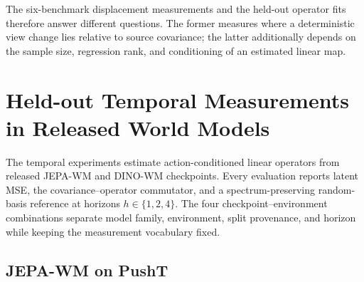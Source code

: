 \documentclass{article}
\begin{document}
\begin{table}[H]
\centering
\small
\setlength{\tabcolsep}{3pt}
\caption{Held-out I-JEPA operator-rank sweep. A low-rank ridge map is fit from source to horizontal-flip features in source-PCA coordinates. The table reports held-out prediction and covariance-relative operator measurements across ranks.}
\label{tab:supp-ijepa-operator}
\end{table}

The six-benchmark displacement measurements and the held-out operator fits
therefore answer different questions. The former measures where a deterministic
view change lies relative to source covariance; the latter additionally
depends on the sample size, regression rank, and conditioning of an estimated
linear map.

\section{Held-out Temporal Measurements in Released World Models}
\label{sec:supp-temporal}

The temporal experiments estimate action-conditioned linear operators from
released JEPA-WM and DINO-WM checkpoints. Every evaluation reports latent MSE,
the covariance--operator commutator, and a spectrum-preserving random-basis
reference at horizons $h\in\{1,2,4\}$. The four checkpoint--environment
combinations separate model family, environment, split provenance, and
horizon while keeping the measurement vocabulary fixed.

\subsection{JEPA-WM on PushT}
\label{sec:supp-jepa-wm-temporal}
\end{document}
